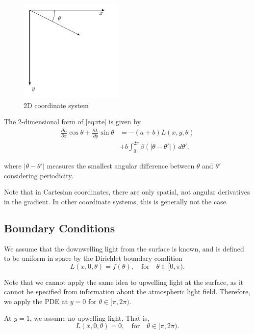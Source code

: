 \documentclass[10pt]{article}
\newcommand\abs[1]{\left| #1 \right|}
\newcommand\pd[2]{\frac{\partial #1}{\partial #2}}
\begin{document}
\begin{multicols}{2}
\begin{figure}[H]
    \centering
    \includegraphics[width=2in]{2d_coords}
    \caption{2D coordinate system}
    \label{fig:coords}
\end{figure}

The 2-dimensional form of \eqref{eq:rte} is given by
\begin{equation}
    \begin{aligned}
        \pd{L}{x} \cos\theta + \pd{L}{y} \sin\theta
        &= -(a+b)L(x,y,\theta) \\
        &+ b\int_0^{2\pi} \beta(\abs{\theta-\theta'})\,d\theta',
    \end{aligned}
    \label{eq:rte2d}
\end{equation}

where $\abs{\theta-\theta'}$ measures the smallest angular difference between $\theta$ and $\theta'$ considering periodicity.

Note that in Cartesian coordinates, there are only spatial, not angular derivatives in the gradient.
In other coordinate systems, this is generally not the case.

\subsection{Boundary Conditions}
We assume that the downwelling light from the surface is known, and is defined to be uniform in space by the Dirichlet boundary condition
\begin{equation}
    L(x,0,\theta) = f(\theta), \quad \mbox{for} \quad \theta \in [0,\pi).
    \label{eq:surf_bc}
\end{equation}

Note that we cannot apply the same idea to upwelling light at the surface, as it cannot be specified from information about the atmospheric light field.
Therefore, we apply the PDE at $y=0$ for $\theta \in [\pi,2\pi)$.

At $y=1$, we assume no upwelling light.
That is,
\begin{equation}
    L(x,0,\theta) = 0, \quad \mbox{for} \quad \theta \in [\pi,2\pi).
    \label{eq:bottom_bc}
\end{equation}


\end{multicols}
\end{document}
